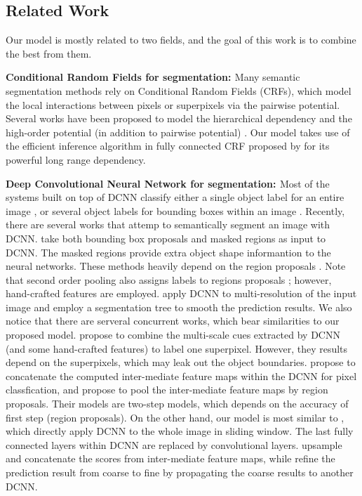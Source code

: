 \subsection{Related Work}
Our model is mostly related to two fields, and the goal of this work is to combine the best from them.

{\bf{Conditional Random Fields for segmentation: }} Many semantic segmentation methods rely on Conditional Random Fields (CRFs), which model the local interactions between pixels \citep{rother2004grabcut, shotton2009textonboost} or superpixels \citep{lucchi2011spatial} via the pairwise potential. Several works have been proposed to model the hierarchical dependency \citep{he2004multiscale, ladicky2009associative, lempitsky2011pylon} and the high-order potential (in addition to pairwise potential) \citep{delong2012fast, gonfaus2010harmony, kohli2009robust, krahenbuhl2011efficient}. Our model takes use of the efficient inference algorithm in fully connected CRF proposed by \citet{krahenbuhl2011efficient} for its powerful long range dependency.

{\bf{Deep Convolutional Neural Network for segmentation: }} Most of the systems built on top of DCNN classify either a single object label for an entire image \citep{KrizhevskyNIPS2013, simonyan2014very, szegedy2014going}, or several object labels for bounding boxes within an image \citep{papandreou2014untangling, girshick2014rcnn}. Recently, there are several works that attemp to semantically segment an image with DCNN. \citet{girshick2014rcnn, hariharan2014simultaneous} take both bounding box proposals and masked regions as input to DCNN. The masked regions provide extra object shape informantion to the neural networks. These methods heavily depend on the region proposals \citep{arbelaez2014multiscale, Uijlings13}. Note that second order pooling \citep{carreira2012semantic} also assigns labels to regions proposals \citep{carreira2012cpmc}; however, hand-crafted features are employed. \citet{farabet2013learning} apply DCNN to multi-resolution of the input image and employ a segmentation tree to smooth the prediction results. We also notice that there are serveral concurrent works, which bear similarities to our proposed model. \citet{mostajabi2014feedforward} propose to combine the multi-scale cues extracted by DCNN (and some hand-crafted features) to label one superpixel. However, they results depend on the superpixels, which may leak out the object boundaries. \citet{hariharan2014hypercolumns} propose to concatenate the computed inter-mediate feature maps within the DCNN for pixel classfication, and \citet{dai2014convolutional} propose to pool the inter-mediate feature maps by region proposals. Their models are two-step models, which depends on the accuracy of first step (\ie region proposals). On the other hand, our model is most similar to \citet{long2014fully, eigen2014predicting}, which directly apply DCNN to the whole image in sliding window. The last fully connected layers within DCNN are replaced by convolutional layers. \citet{long2014fully} upsample and concatenate the scores from inter-mediate feature maps, while \citet{eigen2014predicting} refine the prediction result from coarse to fine by propagating the coarse results to another DCNN. 

